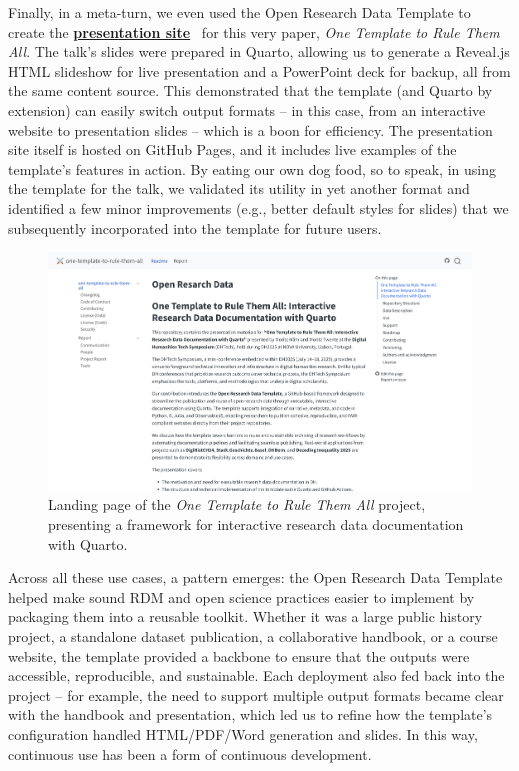 \documentclass{anthology-ch}         %
\begin{document}
Finally, in a meta-turn, we even used the Open Research Data Template to create the \href{https://maehr.github.io/one-template-to-rule-them-all/}{\textbf{presentation site}}~\cite{mahr2025h} for this very paper, \emph{One Template to Rule Them All}. The talk's slides were prepared in Quarto, allowing us to generate a Reveal.js HTML slideshow for live presentation and a PowerPoint deck for backup, all from the same content source. This demonstrated that the template (and Quarto by extension) can easily switch output formats -- in this case, from an interactive website to presentation slides -- which is a boon for efficiency. The presentation site itself is hosted on GitHub Pages, and it includes live examples of the template's features in action. By eating our own dog food, so to speak, in using the template for the talk, we validated its utility in yet another format and identified a few minor improvements (e.g., better default styles for slides) that we subsequently incorporated into the template for future users.

\begin{figure}[t!]
  \centering
  \includegraphics[width=0.9\linewidth]{images/one_template_to_rule_them_all.png}
  \caption{Landing page of the \emph{One Template to Rule Them All} project, presenting a framework for interactive research data documentation with Quarto.}
  \label{fig-one-template}
\end{figure}

Across all these use cases, a pattern emerges: the Open Research Data Template helped make sound RDM and open science practices easier to implement by packaging them into a reusable toolkit. Whether it was a large public history project, a standalone dataset publication, a collaborative handbook, or a course website, the template provided a backbone to ensure that the outputs were accessible, reproducible, and sustainable. Each deployment also fed back into the project -- for example, the need to support multiple output formats became clear with the handbook and presentation, which led us to refine how the template's configuration handled HTML/PDF/Word generation and slides. In this way, continuous use has been a form of continuous development.
\end{document}
